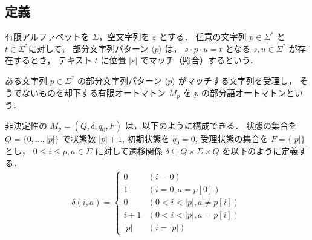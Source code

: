 \documentclass[11pt]{jreport}
\begin{document}
\subsection*{定義}

有限アルファベットを $\Sigma$，空文字列を $\varepsilon$ とする．
任意の文字列 $p \in \Sigma^*$ と $t \in \Sigma^*$に対して，
部分文字列パターン $\langle p \rangle$ は，
$s \cdot p \cdot u = t$ となる $s, u \in \Sigma^*$ が存在するとき，
テキスト $t$ に位置 $|s|$ でマッチ（照合）するという．

\begin{defn}
ある文字列 $p \in\Sigma^*$ の部分文字列パターン $\langle p \rangle$ がマッチする文字列を受理し，
そうでないものを却下する有限オートマトン $M_p$ を $p$ の部分語オートマトンという．

非決定性の $M_p = (Q, \delta, q_0, F)$ は，以下のように構成できる．
状態の集合を $Q = \{0, \ldots, |p|\}$ で状態数 $|p|+1$, 初期状態を $q_0 = 0$, 受理状態の集合を $F = \{ |p| \}$ とし，
$0 \leq i \leq p, a \in \Sigma$ に対して遷移関係 $\delta \subseteq Q \times \Sigma \times Q$ を以下のように定義する．
\begin{eqnarray*}
\delta(i, a) = \left\{
\begin{array}{ll}
 0 & (i = 0) \\
 1 & (i=0, a = p[0]) \\
 0 & (0 < i < |p|, a \neq p[i]) \\
i+1 & (0 < i < |p|, a = p[i]) \\
|p| & (i = |p|)
\end{array}
\right.
\end{eqnarray*}
\end{defn}
\end{document}
